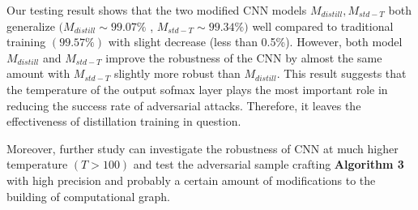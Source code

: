 \documentclass{article}
\begin{document}
Our testing result shows that the two modified CNN models $M_{distill},M_{std-T}$ both generalize $(M_{distill} \sim 99.07\%$ , $M_{std-T} \sim 99.34\%)$ well compared to traditional training $(99.57\%)$ with slight decrease (less than 0.5\%). 
However, both model $M_{distill}$ and $M_{std-T}$ improve the robustness of the CNN by almost the same amount with $M_{std-T}$ slightly more robust than $M_{distill}$. This result suggests that the temperature of the output sofmax layer plays the most important role in reducing the success rate of adversarial attacks. Therefore, it leaves the effectiveness of distillation training in question.

Moreover, further study can investigate the robustness of CNN at much higher temperature $(T > 100)$ and test the adversarial sample crafting \textbf{Algorithm 3} with high precision and probably a certain amount of modifications to the building of computational graph.




\newpage
\appendix
\end{document}

